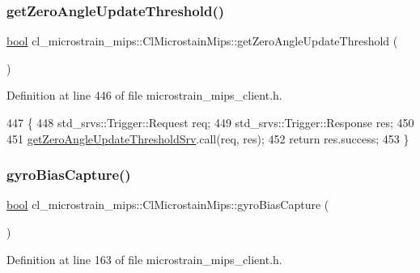 \subsubsection{\texorpdfstring{get\+Zero\+Angle\+Update\+Threshold()}{getZeroAngleUpdateThreshold()}}
{\footnotesize\ttfamily \hyperlink{classbool}{bool} cl\+\_\+microstrain\+\_\+mips\+::\+Cl\+Microstain\+Mips\+::get\+Zero\+Angle\+Update\+Threshold (\begin{DoxyParamCaption}{ }\end{DoxyParamCaption})\hspace{0.3cm}{\ttfamily [inline]}}



Definition at line 446 of file microstrain\+\_\+mips\+\_\+client.\+h.


\begin{DoxyCode}
447     \{
448         std\_srvs::Trigger::Request req;
449         std\_srvs::Trigger::Response res;
450 
451         \hyperlink{classcl__microstrain__mips_1_1ClMicrostainMips_ae720970f4114e7b6524b59df405ede83}{getZeroAngleUpdateThresholdSrv}.call(req, res);
452         \textcolor{keywordflow}{return} res.success;
453     \}
\end{DoxyCode}
\mbox{\label{classcl__microstrain__mips_1_1ClMicrostainMips_ada40a42a0d479c9651bc4a735a76ce39}} 
\subsubsection{\texorpdfstring{gyro\+Bias\+Capture()}{gyroBiasCapture()}}
{\footnotesize\ttfamily \hyperlink{classbool}{bool} cl\+\_\+microstrain\+\_\+mips\+::\+Cl\+Microstain\+Mips\+::gyro\+Bias\+Capture (\begin{DoxyParamCaption}{ }\end{DoxyParamCaption})\hspace{0.3cm}{\ttfamily [inline]}}



Definition at line 163 of file microstrain\+\_\+mips\+\_\+client.\+h.



